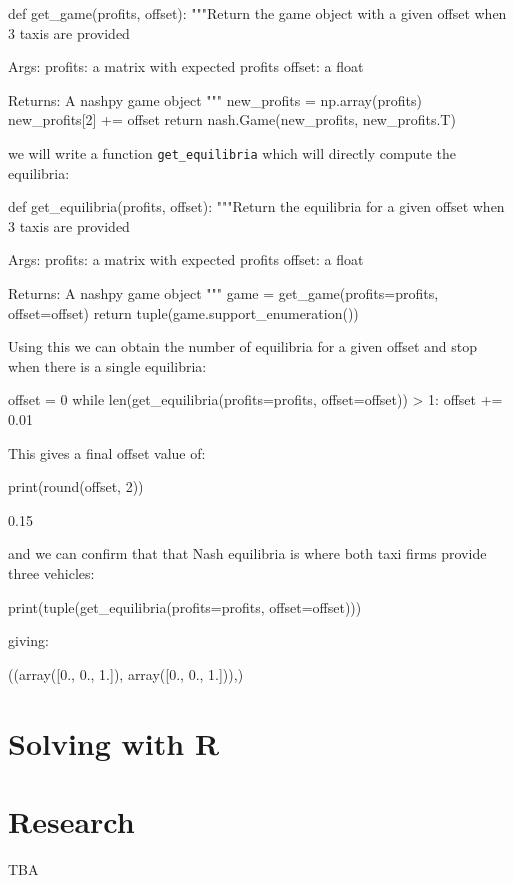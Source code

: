 \begin{pyin}
def get_game(profits, offset):
    """Return the game object with a given offset
    when 3 taxis are provided

    Args:
        profits: a matrix with expected profits
        offset: a float

    Returns:
        A nashpy game object
    """
    new_profits = np.array(profits)
    new_profits[2] += offset
    return nash.Game(new_profits, new_profits.T)
\end{pyin}

we will write a function \texttt{get_equilibria} which will directly
compute the equilibria:

\begin{pyin}
def get_equilibria(profits, offset):
    """Return the equilibria for a given offset
    when 3 taxis are provided

    Args:
        profits: a matrix with expected profits
        offset: a float

    Returns:
        A nashpy game object
    """
    game = get_game(profits=profits, offset=offset)
    return tuple(game.support_enumeration())
\end{pyin}


Using this we can obtain the number of equilibria for a given offset and stop
when there is a single equilibria:

\begin{pyin}
offset = 0
while len(get_equilibria(profits=profits, offset=offset)) > 1:
    offset += 0.01
\end{pyin}

This gives a final offset value of:

\begin{pyin}
print(round(offset, 2))
\end{pyin}


\begin{pyout}
0.15
\end{pyout}

and we can confirm that that Nash equilibria is where both taxi firms provide
three vehicles:

\begin{pyin}
print(tuple(get_equilibria(profits=profits, offset=offset)))
\end{pyin}

giving:

\begin{pyout}
((array([0., 0., 1.]), array([0., 0., 1.])),)
\end{pyout}

\section{Solving with R}\label{sec:solving-with-R}
\section{Research}\label{sec:research}

TBA
